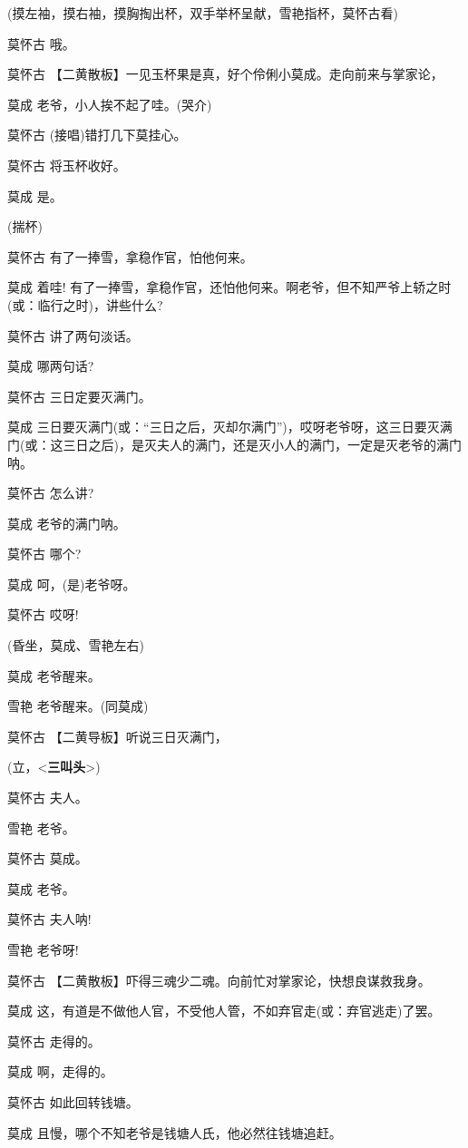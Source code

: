 (摸左袖，摸右袖，摸胸掏出杯，双手举杯呈献，雪艳指杯，莫怀古看)

莫怀古 哦。

莫怀古 【二黄散板】一见玉杯果是真，好个伶俐小莫成。走向前来与掌家论，

莫成 老爷，小人挨不起了哇。(哭介)

莫怀古 (接唱)错打几下莫挂心。

莫怀古 将玉杯收好。

莫成 是。

(揣杯)

莫怀古 有了一捧雪，拿稳作官，怕他何来。

莫成 着哇!
有了一捧雪，拿稳作官，还怕他何来。啊老爷，但不知严爷上轿之时(或：临行之时)，讲些什么?

莫怀古 讲了两句淡话。

莫成 哪两句话?

莫怀古 三日定要灭满门。

莫成
三日要灭满门(或：``三日之后，灭却尔满门'')，哎呀老爷呀，这三日要灭满门(或：这三日之后)，是灭夫人的满门，还是灭小人的满门，一定是灭老爷的满门呐。

莫怀古 怎么讲?

莫成 老爷的满门呐。

莫怀古 哪个?

莫成 呵，(是)老爷呀。

莫怀古 哎呀!

(昏坐，莫成、雪艳左右)

莫成 老爷醒来。

雪艳 老爷醒来。(同莫成)

莫怀古 【二黄导板】听说三日灭满门，

(立，\textless{}\textbf{三叫头}\textgreater{})

莫怀古 夫人。

雪艳 老爷。

莫怀古 莫成。

莫成 老爷。

莫怀古 夫人呐!

雪艳 老爷呀!

莫怀古 【二黄散板】吓得三魂少二魂。向前忙对掌家论，快想良谋救我身。

莫成 这，有道是不做他人官，不受他人管，不如弃官走(或：弃官逃走)了罢。

莫怀古 走得的。

莫成 啊，走得的。

莫怀古 如此回转钱塘。

莫成 且慢，哪个不知老爷是钱塘人氏，他必然往钱塘追赶。


